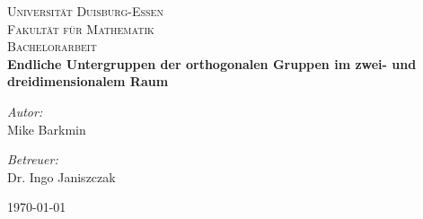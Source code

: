 
\begin{titlepage}
\begin{center}


\textsc{\LARGE Universität Duisburg-Essen}\\
\textsc{Fakultät für Mathematik}\\[6.8cm]

\textsc{\Large Bachelorarbeit}\\[0.5cm]

{ \huge \bfseries Endliche Untergruppen der orthogonalen Gruppen im zwei- und dreidimensionalem Raum \\[0.8cm] }

\begin{minipage}{0.4\textwidth}
\begin{flushleft} \large
\emph{Autor:}\\
Mike Barkmin
\end{flushleft}
\end{minipage}
\begin{minipage}{0.4\textwidth}
\begin{flushright} \large
\emph{Betreuer:} \\
Dr. Ingo Janiszczak
\end{flushright}
\end{minipage}

\vfill

{\large \today}
\end{center}
\end{titlepage}
